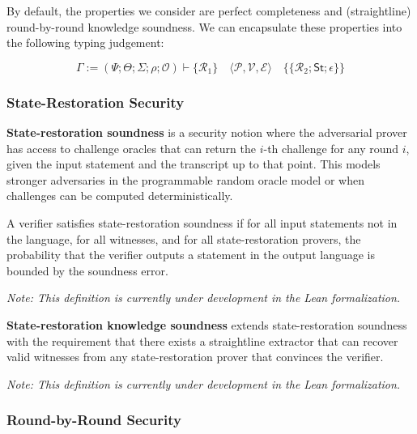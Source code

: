 By default, the properties we consider are perfect completeness and (straightline) round-by-round knowledge soundness. We can encapsulate these properties into the following typing judgement:

\[
    \Gamma := (\Psi; \Theta; \varSigma; \rho; \mathcal{O}) \vdash \{\mathcal{R}_1\} \quad \langle\mathcal{P}, \mathcal{V}, \mathcal{E}\rangle \quad \{\!\!\{\mathcal{R}_2; \mathsf{St}; \epsilon\}\!\!\}
\]

\subsubsection{State-Restoration Security}

\begin{definition}
    \label{def:sr_soundness}
    \textbf{State-restoration soundness} is a security notion where the adversarial prover has access to
    challenge oracles that can return the $i$-th challenge for any round $i$, given the input statement
    and the transcript up to that point. This models stronger adversaries in the programmable random
    oracle model or when challenges can be computed deterministically.

    A verifier satisfies state-restoration soundness if for all input statements not in the language,
    for all witnesses, and for all state-restoration provers, the probability that the verifier
    outputs a statement in the output language is bounded by the soundness error.

    \emph{Note: This definition is currently under development in the Lean formalization.}
\end{definition}

\begin{definition}
    \label{def:sr_knowledge_soundness}
    \textbf{State-restoration knowledge soundness} extends state-restoration soundness with the
    requirement that there exists a straightline extractor that can recover valid witnesses from
    any state-restoration prover that convinces the verifier.

    \emph{Note: This definition is currently under development in the Lean formalization.}
\end{definition}

\subsubsection{Round-by-Round Security}

